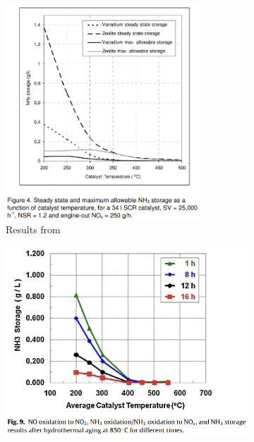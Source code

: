 \begin{figure}[H]
    \begin{minipage}{0.4\textwidth}
        \begin{figure}[H]
            \includegraphics[width = 0.8\textwidth]{./figs/storage_capacity/sae.png}
            \caption*{Results from \cite{willems2007closed}}
        \end{figure}
    \end{minipage}
    \begin{minipage}{0.4\textwidth}
        \begin{figure}[H]
            \includegraphics[width = \textwidth]{./figs/storage_capacity/th1.png}

\end{figure}
\end{minipage}
\end{figure}
